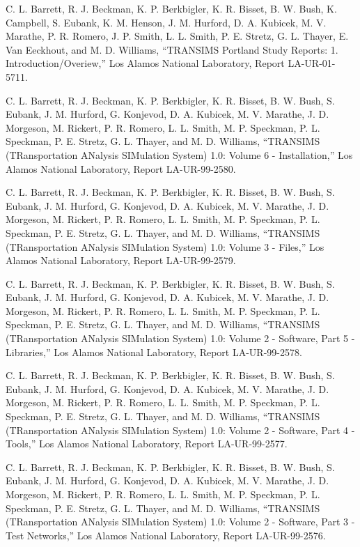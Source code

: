 \documentclass[]{article}
\begin{document}
C. L. Barrett, R. J. Beckman, K. P. Berkbigler, K. R. Bisset, B. W.
Bush, K. Campbell, S. Eubank, K. M. Henson, J. M. Hurford, D. A.
Kubicek, M. V. Marathe, P. R. Romero, J. P. Smith, L. L. Smith, P. E.
Stretz, G. L. Thayer, E. Van Eeckhout, and M. D. Williams, ``TRANSIMS
Portland Study Reports: 1. Introduction/Overiew,'' Los Alamos National
Laboratory, Report LA-UR-01-5711.

C. L. Barrett, R. J. Beckman, K. P. Berkbigler, K. R. Bisset, B. W.
Bush, S. Eubank, J. M. Hurford, G. Konjevod, D. A. Kubicek, M. V.
Marathe, J. D. Morgeson, M. Rickert, P. R. Romero, L. L. Smith, M. P.
Speckman, P. L. Speckman, P. E. Stretz, G. L. Thayer, and M. D.
Williams, ``TRANSIMS (TRansportation ANalysis SIMulation System) 1.0:
Volume 6 - Installation,'' Los Alamos National Laboratory, Report
LA-UR-99-2580.

C. L. Barrett, R. J. Beckman, K. P. Berkbigler, K. R. Bisset, B. W.
Bush, S. Eubank, J. M. Hurford, G. Konjevod, D. A. Kubicek, M. V.
Marathe, J. D. Morgeson, M. Rickert, P. R. Romero, L. L. Smith, M. P.
Speckman, P. L. Speckman, P. E. Stretz, G. L. Thayer, and M. D.
Williams, ``TRANSIMS (TRansportation ANalysis SIMulation System) 1.0:
Volume 3 - Files,'' Los Alamos National Laboratory, Report
LA-UR-99-2579.

C. L. Barrett, R. J. Beckman, K. P. Berkbigler, K. R. Bisset, B. W.
Bush, S. Eubank, J. M. Hurford, G. Konjevod, D. A. Kubicek, M. V.
Marathe, J. D. Morgeson, M. Rickert, P. R. Romero, L. L. Smith, M. P.
Speckman, P. L. Speckman, P. E. Stretz, G. L. Thayer, and M. D.
Williams, ``TRANSIMS (TRansportation ANalysis SIMulation System) 1.0:
Volume 2 - Software, Part 5 - Libraries,'' Los Alamos National
Laboratory, Report LA-UR-99-2578.

C. L. Barrett, R. J. Beckman, K. P. Berkbigler, K. R. Bisset, B. W.
Bush, S. Eubank, J. M. Hurford, G. Konjevod, D. A. Kubicek, M. V.
Marathe, J. D. Morgeson, M. Rickert, P. R. Romero, L. L. Smith, M. P.
Speckman, P. L. Speckman, P. E. Stretz, G. L. Thayer, and M. D.
Williams, ``TRANSIMS (TRansportation ANalysis SIMulation System) 1.0:
Volume 2 - Software, Part 4 - Tools,'' Los Alamos National Laboratory,
Report LA-UR-99-2577.

C. L. Barrett, R. J. Beckman, K. P. Berkbigler, K. R. Bisset, B. W.
Bush, S. Eubank, J. M. Hurford, G. Konjevod, D. A. Kubicek, M. V.
Marathe, J. D. Morgeson, M. Rickert, P. R. Romero, L. L. Smith, M. P.
Speckman, P. L. Speckman, P. E. Stretz, G. L. Thayer, and M. D.
Williams, ``TRANSIMS (TRansportation ANalysis SIMulation System) 1.0:
Volume 2 - Software, Part 3 - Test Networks,'' Los Alamos National
Laboratory, Report LA-UR-99-2576.
\end{document}
